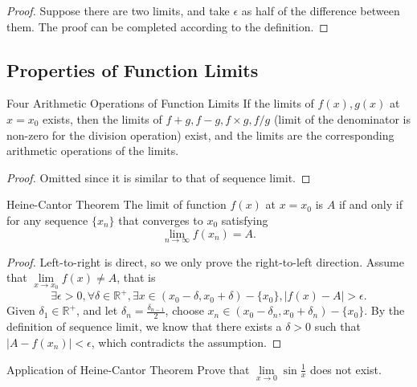 \begin{proof}
  Suppose there are two limits, and take $\epsilon$ as half of the difference
  between them.
  The proof can be completed according to the definition.
\end{proof}

\subsection{Properties of Function Limits}

\begin{proposition}{Four Arithmetic Operations of Function Limits}{}
  If the limits of $f(x), g(x)$ at $x = x_0$ exists,
  then the limits of $f+g, f-g, f \times g, f/g$
  (limit of the denominator is non-zero for the division operation)
  exist,
  and the limits are the corresponding arithmetic operations of the limits.
\end{proposition}

\begin{proof}
  Omitted since it is similar to that of sequence limit.
\end{proof}

\begin{theorem}{Heine-Cantor Theorem}{}
  The limit of function $f(x)$ at $x = x_0$ is $A$ if and only if
  for any sequence $\{x_n\}$ that converges to $x_0$ satisfying
  \begin{equation}
    \lim \limits _{n \rightarrow \infty} f(x_n) = A.
  \end{equation}
\end{theorem}

\begin{proof}
  Left-to-right is direct, so we only prove the right-to-left direction.
  Assume that $\lim \limits _{x \rightarrow x_0}f(x) \neq A$,
  that is
  \begin{equation}
    \exists \epsilon > 0, \forall \delta \in \mathbb{R}^+,
    \exists x \in (x_0 - \delta, x_0 + \delta) - \{x_0\},
    |f(x) - A| > \epsilon.
  \end{equation}
  Given $\delta_1 \in \mathbb{R}^+$,
  and let $\delta_n = \frac{\delta_{n-1}}{2}$,
  choose $x_n \in (x_0 - \delta_n, x_0 + \delta_n) - \{x_0\}$.
  By the definition of sequence limit, we know that there exists a $\delta > 0$
  such that $|A - f(x_n)| < \epsilon$, which contradicts the assumption.
\end{proof}

\begin{example}{Application of Heine-Cantor Theorem}{}
  Prove that $\lim \limits _{x \rightarrow 0}
  \sin \frac{1}{x}$ does not exist.
\end{example}

